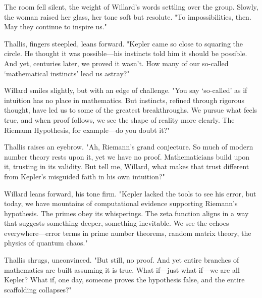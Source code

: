 \smallskip

The room fell silent, the weight of Willard’s words settling over the group. Slowly, the woman raised her glass, her tone soft but resolute.  
"To impossibilities, then. May they continue to inspire us."



\smallskip

Thallis, fingers steepled, leans forward.  
"Kepler came so close to squaring the circle. He thought it was possible—his instincts told him it should be possible. And yet, centuries later, we proved it wasn’t. How many of our so-called ‘mathematical instincts’ lead us astray?"

\smallskip

Willard smiles slightly, but with an edge of challenge.  
"You say ‘so-called’ as if intuition has no place in mathematics. But instincts, refined through rigorous thought, have led us to some of the greatest breakthroughs. We pursue what feels true, and when proof follows, we see the shape of reality more clearly. The Riemann Hypothesis, for example—do you doubt it?"

\smallskip

Thallis raises an eyebrow.  
"Ah, Riemann’s grand conjecture. So much of modern number theory rests upon it, yet we have no proof. Mathematicians build upon it, trusting in its validity. But tell me, Willard, what makes that trust different from Kepler’s misguided faith in his own intuition?"

\smallskip

Willard leans forward, his tone firm.  
"Kepler lacked the tools to see his error, but today, we have mountains of computational evidence supporting Riemann’s hypothesis. The primes obey its whisperings. The zeta function aligns in a way that suggests something deeper, something inevitable. We see the echoes everywhere—error terms in prime number theorems, random matrix theory, the physics of quantum chaos."

\smallskip

Thallis shrugs, unconvinced.  
"But still, no proof. And yet entire branches of mathematics are built assuming it is true. What if—just what if—we are all Kepler? What if, one day, someone proves the hypothesis false, and the entire scaffolding collapses?"

\smallskip

